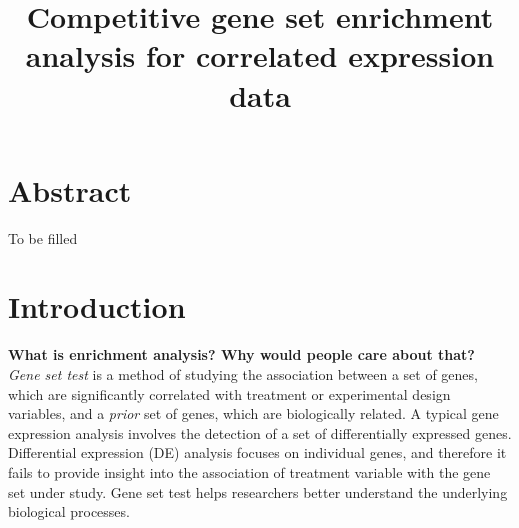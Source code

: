 \documentclass[11pt, a4paper]{article}
\title{Competitive gene set enrichment analysis for correlated expression data}
\date{} %
\begin{document}
	\newpage
	\maketitle
	
	\section*{Abstract}
	To be filled
	
	\section{Introduction}\label{section:introduction}
	
	\textbf{What is enrichment analysis? Why would people care about that?}\\
	 \textit{Gene set test} is a method of studying the association between a set of genes, which are significantly correlated with treatment or experimental design variables, and a \textit{prior} set of genes, which are biologically related. A typical gene expression analysis involves the detection of a set of differentially expressed genes. Differential expression (DE) analysis focuses on individual genes, and therefore it fails to provide insight into the association of treatment variable with the gene set under study. Gene set test helps researchers better understand the underlying biological processes.
	 
\end{document}
